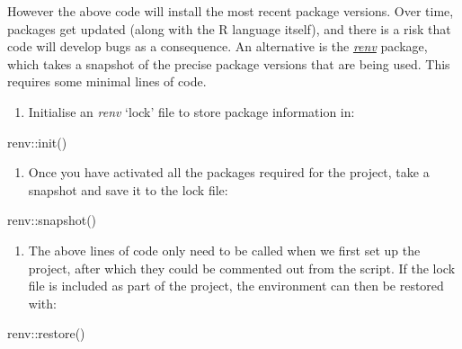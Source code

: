 \documentclass[
]{article}
\newenvironment{Shaded}{\begin{snugshade}}{\end{snugshade}}
\newcommand{\FunctionTok}[1]{\textcolor[rgb]{0.00,0.00,0.00}{#1}}
\newcommand{\NormalTok}[1]{#1}
\newcommand{\SpecialCharTok}[1]{\textcolor[rgb]{0.00,0.00,0.00}{#1}}
\providecommand{\tightlist}{%
  \setlength{\itemsep}{0pt}\setlength{\parskip}{0pt}}
\begin{document}
However the above code will install the most recent package versions. Over time, packages get updated (along with the R language itself), and there is a risk that code will develop bugs as a consequence. An alternative is the \href{https://rstudio.github.io/renv/articles/renv.html}{\emph{renv}} package, which takes a snapshot of the precise package versions that are being used. This requires some minimal lines of code.

\begin{enumerate}
\def\labelenumi{\arabic{enumi}.}
\tightlist
\item
  Initialise an \emph{renv} `lock' file to store package information in:
\end{enumerate}

\begin{Shaded}
\begin{Highlighting}[]
\NormalTok{renv}\SpecialCharTok{::}\FunctionTok{init}\NormalTok{()}
\end{Highlighting}
\end{Shaded}

\begin{enumerate}
\def\labelenumi{\arabic{enumi}.}
\setcounter{enumi}{1}
\tightlist
\item
  Once you have activated all the packages required for the project, take a snapshot and save it to the lock file:
\end{enumerate}

\begin{Shaded}
\begin{Highlighting}[]
\NormalTok{renv}\SpecialCharTok{::}\FunctionTok{snapshot}\NormalTok{()}
\end{Highlighting}
\end{Shaded}

\begin{enumerate}
\def\labelenumi{\arabic{enumi}.}
\setcounter{enumi}{2}
\tightlist
\item
  The above lines of code only need to be called when we first set up the project, after which they could be commented out from the script. If the lock file is included as part of the project, the environment can then be restored with:
\end{enumerate}

\begin{Shaded}
\begin{Highlighting}[]
\NormalTok{renv}\SpecialCharTok{::}\FunctionTok{restore}\NormalTok{()}
\end{Highlighting}
\end{Shaded}
\end{document}
